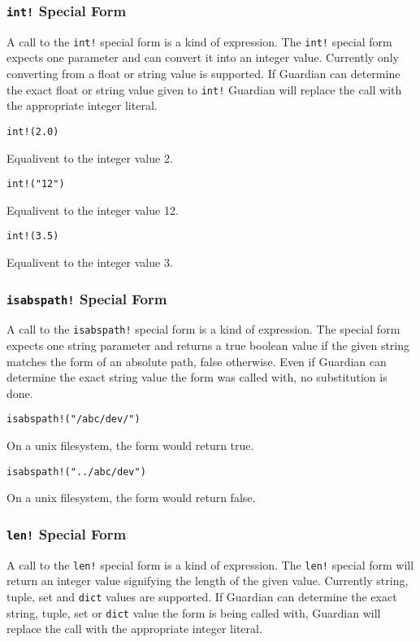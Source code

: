 {	\subsubsection{\texttt{int!} Special Form}
	{
		A call to the \texttt{int!} special form is a kind of expression.
		The \texttt{int!} special form expects one parameter and can convert it
		into an integer value. Currently only converting from a float or string
		value is supported.
		If Guardian can determine the exact float or string value given to
		\texttt{int!} Guardian will replace the call with the appropriate
		integer literal.
		
		\begin{itemize}
		{
			\item[] \texttt{int!(2.0)}
			
				Equalivent to the integer value 2.
			
			\item[] \texttt{int!("12")}
			
				Equalivent to the integer value 12.
			
			\item[] \texttt{int!(3.5)}
			
				Equalivent to the integer value 3.
		}
		\end{itemize}
	}
	
	\subsubsection{\texttt{isabspath!} Special Form}
	{
		A call to the \texttt{isabspath!} special form is a kind of expression.
		The special form expects one string parameter and returns a true boolean
		value if the given string matches the form of an absolute path, false
		otherwise.
		Even if Guardian can determine the exact string value the form was
		called with, no substitution is done.
		
		\begin{itemize}
		{
			\item[] \texttt{isabspath!("/abc/dev/")}
			
				On a unix filesystem, the form would return true.
			
			\item[] \texttt{isabspath!("../abc/dev")}
			
				On a unix filesystem, the form would return false.
		}
		\end{itemize}
	}
	
	\subsubsection{\texttt{len!} Special Form}
	{
		A call to the \texttt{len!} special form is a kind of expression.
		The \texttt{len!} special form will return an integer value signifying
		the length of the given value. Currently string, tuple, set
		and \texttt{dict} values are supported.
		If Guardian can determine the exact string, tuple, set or \texttt{dict}
		value the form is being called with, Guardian will replace the call with
		the appropriate integer literal.
		
}}
